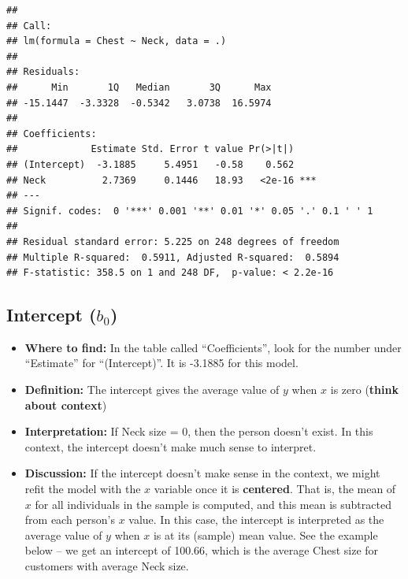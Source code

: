 \documentclass[]{book}
\newenvironment{Shaded}{\begin{snugshade}}{\end{snugshade}}
\newcommand{\DataTypeTok}[1]{\textcolor[rgb]{0.13,0.29,0.53}{#1}}
\newcommand{\KeywordTok}[1]{\textcolor[rgb]{0.13,0.29,0.53}{\textbf{#1}}}
\newcommand{\NormalTok}[1]{#1}
\newcommand{\OperatorTok}[1]{\textcolor[rgb]{0.81,0.36,0.00}{\textbf{#1}}}
\newcommand{\StringTok}[1]{\textcolor[rgb]{0.31,0.60,0.02}{#1}}
\providecommand{\tightlist}{%
  \setlength{\itemsep}{0pt}\setlength{\parskip}{0pt}}
\begin{document}
\begin{Shaded}
\end{Shaded}

\begin{verbatim}
## 
## Call:
## lm(formula = Chest ~ Neck, data = .)
## 
## Residuals:
##      Min       1Q   Median       3Q      Max 
## -15.1447  -3.3328  -0.5342   3.0738  16.5974 
## 
## Coefficients:
##             Estimate Std. Error t value Pr(>|t|)    
## (Intercept)  -3.1885     5.4951   -0.58    0.562    
## Neck          2.7369     0.1446   18.93   <2e-16 ***
## ---
## Signif. codes:  0 '***' 0.001 '**' 0.01 '*' 0.05 '.' 0.1 ' ' 1
## 
## Residual standard error: 5.225 on 248 degrees of freedom
## Multiple R-squared:  0.5911, Adjusted R-squared:  0.5894 
## F-statistic: 358.5 on 1 and 248 DF,  p-value: < 2.2e-16
\end{verbatim}

\hypertarget{intercept-b_0}{%
\subsection{\texorpdfstring{Intercept (\(b_0\))}{Intercept (b\_0)}}\label{intercept-b_0}}

\begin{itemize}
\tightlist
\item
  \textbf{Where to find:} In the table called ``Coefficients'', look for the number under ``Estimate'' for ``(Intercept)''. It is -3.1885 for this model.
\item
  \textbf{Definition:} The intercept gives the average value of \(y\) when \(x\) is zero (\textbf{think about context})
\item
  \textbf{Interpretation:} If Neck size = 0, then the person doesn't exist. In this context, the intercept doesn't make much sense to interpret.
\item
  \textbf{Discussion:} If the intercept doesn't make sense in the context, we might refit the model with the \(x\) variable once it is \textbf{centered}. That is, the mean of \(x\) for all individuals in the sample is computed, and this mean is subtracted from each person's \(x\) value. In this case, the intercept is interpreted as the average value of \(y\) when \(x\) is at its (sample) mean value. See the example below -- we get an intercept of 100.66, which is the average Chest size for customers with average Neck size.
\end{itemize}
\end{document}
